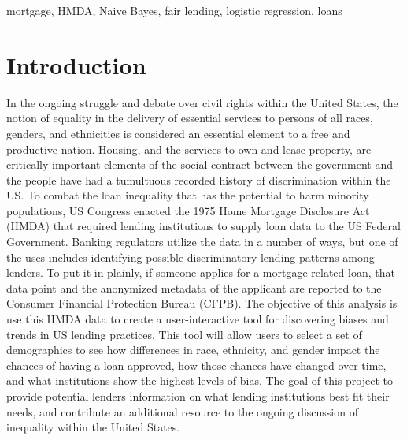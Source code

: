 \documentclass[conference,compsoc]{IEEEtran}
\begin{document}
\begin{keywords}
mortgage, HMDA, Naive Bayes, fair lending, logistic regression, loans
\end{keywords}

%
\IEEEpeerreviewmaketitle



\section{Introduction}

In the ongoing struggle and debate over civil rights within the United States, the notion of equality in the delivery of essential services to persons of all races, genders, and ethnicities is considered an essential element to a free and productive nation. Housing, and the services to own and lease property, are  critically important elements of the social contract between the government and the people have had a tumultuous recorded history of discrimination within the US. To combat the loan inequality that has the potential to harm minority populations, US Congress enacted the 1975 Home Mortgage Disclosure Act (HMDA) that required lending institutions to supply loan data to the US Federal Government.  Banking regulators utilize the data in a number of ways, but one of the uses includes identifying possible discriminatory lending patterns among lenders.  To put it in plainly, if someone applies for a mortgage related loan, that data point and the anonymized metadata of the applicant are reported to the Consumer Financial Protection Bureau (CFPB). 
The objective of this analysis is use this HMDA data to create a user-interactive tool for discovering biases and trends in US lending practices. This tool will allow users to select a set of demographics to see how differences in race, ethnicity, and gender impact the chances of having a loan approved, how those chances have changed over time, and what institutions show the highest levels of bias. The goal of this project to provide potential lenders information on what lending institutions best fit their needs, and contribute an additional resource to the ongoing discussion of inequality within the United States.
\end{document}
